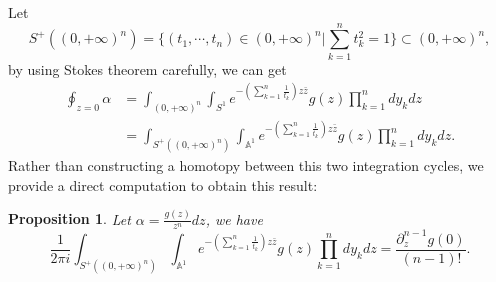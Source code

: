 \documentclass[11pt]{amsart}
\newtheorem{prop}[thm]{Proposition}
\theoremstyle{definition}
\theoremstyle{remark}
\numberwithin{equation}{section}
\begin{document}
Let 
$$S^{+}((0,+\infty)^n)=\{(t_{1},\cdots,t_{n})\in(0,+\infty)^{n}|\sum_{k=1}^{n}t_{k}^{2}=1\} \subset (0,+\infty)^{n},
$$
by using Stokes theorem carefully, we can get 
\begin{align*}
\oint_{z=0}\alpha
&=\int_{(0,+\infty)^{n}}\int_{S^{1}}e^{-\left(\sum_{k=1}^{n}\frac{1}{t_{k}}\right)z\bar{z}}g(z)\prod_{k=1}^{n}dy_{k}dz\\
&=\int_{S^{+}((0,+\infty)^n)}\int_{\mathbb{A}^{1}}e^{-\left(\sum_{k=1}^{n}\frac{1}{t_{k}}\right)z\bar{z}}g(z)\prod_{k=1}^{n}dy_{k}dz.
\end{align*}
Rather than constructing a homotopy between this two integration cycles, we provide a direct computation to obtain this result:
\begin{prop}
    Let $\alpha=\frac{g(z)}{z^{n}}dz$, we have
    $$
    \frac{1}{2\pi i}\int_{S^{+}((0,+\infty)^n)}\int_{\mathbb{A}^{1}}e^{-\left(\sum_{k=1}^{n}\frac{1}{t_{k}}\right)z\bar{z}}g(z)\prod_{k=1}^{n}dy_{k}dz=\frac{\partial_{z}^{n-1}g(0)}{(n-1)!}.
    $$
\end{prop}
\end{document}

